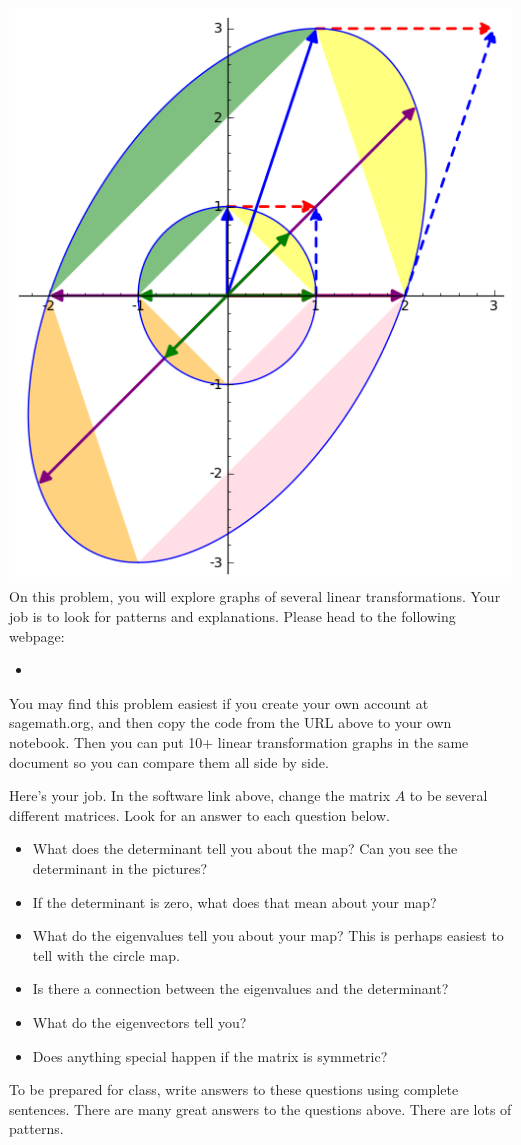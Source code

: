 \begin{problem}
{\includegraphics[width=\marginparwidth]{lineartransformation2.png}
}%
 On this problem, you will explore graphs of several linear transformations. Your job is to look for patterns and explanations.  Please head to the following webpage:
\begin{itemize}
 \item \href{\urllineartransformationsinplane}{\urllineartransformationsinplane}
\end{itemize}
You may find this problem easiest if you create your own account at sagemath.org, and then copy the code from the URL above to your own notebook. Then you can put 10+ linear transformation graphs in the same document so you can compare them all side by side. 

Here's your job. In the software link above, change the matrix $A$ to be several different matrices. Look for an answer to each question below.
\begin{itemize}
 \item What does the determinant tell you about the map? Can you see the determinant in the pictures?
 \item If the determinant is zero, what does that mean about your map?
 \item What do the eigenvalues tell you about your map? This is perhaps easiest to tell with the circle map.
 \item Is there a connection between the eigenvalues and the determinant?
 \item What do the eigenvectors tell you?
 \item Does anything special happen if the matrix is symmetric?
\end{itemize}
To be prepared for class, write answers to these questions using complete sentences.
There are many great answers to the questions above. There are lots of patterns. 


\end{problem}
